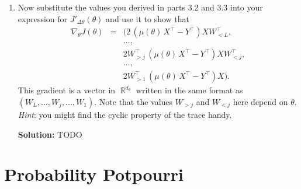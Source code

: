 \documentclass{article}
\newcommand{\Question}[1]{\Large \section{ #1 } \normalsize}
\DeclareMathOperator{\R}{\mathbb{R}}
\newenvironment{solution}{\color{blue} \smallskip \textbf{Solution:}}{}
\begin{document}
\begin{enumerate}
    \item
    Now substitute the values you derived in parts 3.2 and 3.3 into your expression for $J'_{\Delta \theta}(\theta)$ and use it to show that
    \begin{eqnarray*}
    \nabla_\theta J(\theta) & = & (2 \, (\mu(\theta)\, X^\top - Y^\top) X W_{<L}^\top, \\ 
                            &   & \ldots, \\
                            &   & 2 W_{>j}^\top \, (\mu(\theta)\, X^\top - Y^\top) X W_{<j}^\top, \\
                            &   & \ldots, \\
                            &   & 2 W_{>1}^\top \, (\mu(\theta)\, X^\top - Y^\top) X).
    \end{eqnarray*}
    This gradient is a vector in $\R^{d_\theta}$ written in the same format as $(W_L, \ldots, W_j, \ldots, W_1)$.
    Note that the values $W_{>j}$ and $W_{<j}$ here depend on $\theta$. \\
    {\em Hint}:  you might find the cyclic property of the trace handy.

    \begin{solution}
        TODO
    \end{solution}

\end{enumerate}

\newpage
\Question{Probability Potpourri}
\end{document}
